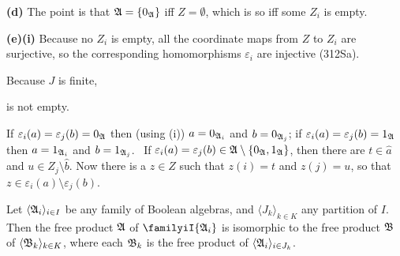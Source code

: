 {\medskip

{\bf (d)} The point is that $\frak A=\{0_{\frak A}\}$ iff $Z=\emptyset$,
which is so iff some $Z_i$ is empty.

\medskip

{\bf (e)(i)} Because no $Z_i$ is empty, all the coordinate maps from $Z$
to $Z_i$ are surjective, so the corresponding homomorphisms
$\varepsilon_i$ are injective (312Sa).

\medskip

 Because $J$ is finite,


\noindent is not empty.

\medskip

 If $\varepsilon_i(a)=\varepsilon_j(b)=0_{\frak A}$ then
(using (i)) $a=0_{\frak A_i}$ and $b=0_{\frak A_j}$;
if $\varepsilon_i(a)=\varepsilon_j(b)=1_{\frak A}$ then
$a=1_{\frak A_i}$ and $b=1_{\frak A_j}$.   \Quer\ If $\varepsilon_i(a)
=\varepsilon_j(b)\in\frak A\setminus\{0_{\frak A},1_{\frak A}\}$, then
there are $t\in\widehat a$ and $u\in Z_j\setminus\widehat b$.   Now
there is a $z\in Z$ such that $z(i)=t$ and $z(j)=u$, so that
$z\in\varepsilon_i(a)\setminus\varepsilon_j(b)$.   \Bang
}%

Let $\langle \frak A_i\rangle_{i\in I}$ be
any family of Boolean algebras, and $\langle J_k\rangle_{k\in K}$ any
partition of $I$.   Then the
free product $\frak A$ of $\familyiI{\frak A_i}$ is isomorphic to the free product $\frak B$ of
$\langle\frak B_k\rangle_{k\in K}$, where each $\frak B_k$ is the free
product of $\langle \frak A_i\rangle_{i\in J_k}$.

